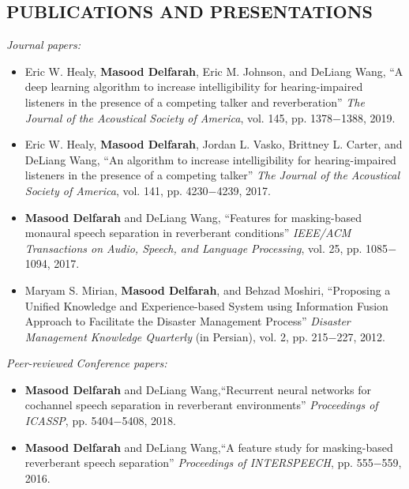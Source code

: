 \documentclass[margin, 10pt]{res}
\begin{document}
\begin{resume}
\section{PUBLICATIONS AND PRESENTATIONS}
\textit{Journal papers:}
\begin{itemize}
\item Eric W. Healy, \textbf{Masood Delfarah}, Eric M. Johnson, and DeLiang Wang, ``A deep learning algorithm to increase intelligibility for hearing-impaired listeners in the presence of a competing talker and reverberation'' \textit{The Journal of the Acoustical Society of America}, vol. 145, pp. 1378$-$1388, 2019.
\item Eric W. Healy, \textbf{Masood Delfarah}, Jordan L. Vasko, Brittney L. Carter, and DeLiang Wang, ``An algorithm to increase intelligibility for hearing-impaired listeners in the presence of a competing talker'' \textit{The Journal of the Acoustical Society of America}, vol. 141, pp. 4230$-$4239, 2017.
\item \textbf{Masood Delfarah} and DeLiang Wang, ``Features for masking-based monaural speech separation in reverberant conditions'' \textit{IEEE/ACM Transactions on Audio, Speech, and Language Processing}, vol. 25, pp. 1085$-$1094, 2017.
\item Maryam S. Mirian, \textbf{Masood Delfarah}, and Behzad Moshiri, ``Proposing a Unified Knowledge and Experience-based System using Information Fusion Approach to Facilitate the Disaster Management Process'' \textit{Disaster Management Knowledge Quarterly} (in Persian), vol. 2, pp. 215$-$227, 2012. 
\end{itemize}
\textit{Peer-reviewed Conference papers:}
\begin{itemize}
\item \textbf{Masood Delfarah} and DeLiang Wang,``Recurrent neural networks for cochannel speech separation in reverberant environments'' \textit{Proceedings of ICASSP}, pp. 5404$-$5408, 2018.
\item \textbf{Masood Delfarah} and DeLiang Wang,``A feature study for masking-based reverberant speech separation'' \textit{Proceedings of INTERSPEECH}, pp. 555$-$559, 2016.
\end{itemize}

\end{resume}
\end{document}
